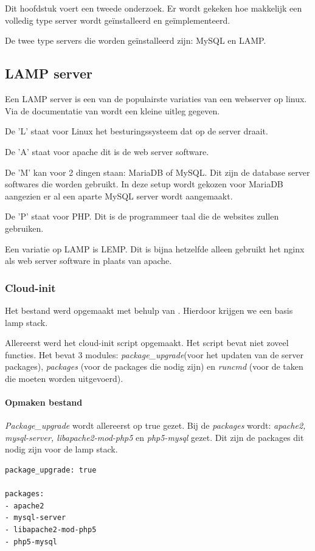 \chapter{}
\label{ch:serverconf}
Dit hoofdstuk voert een tweede onderzoek. Er wordt gekeken hoe makkelijk een volledig type server wordt geïnstalleerd en geïmplementeerd. 

De twee type servers die worden geïnstalleerd zijn: MySQL en LAMP.

\section{LAMP server}
Een LAMP server is een van de populairste variaties van een webserver op linux. Via de documentatie van \autocite{lamp} wordt een kleine uitleg gegeven.

De 'L' staat voor Linux het besturingssysteem dat op de server draait. 

De 'A' staat voor apache dit is de web server software. 

De 'M' kan voor 2 dingen staan: MariaDB of MySQL. Dit zijn de database server softwares die worden gebruikt. In deze setup wordt gekozen voor MariaDB aangezien er al een aparte MySQL server wordt aangemaakt.

De 'P' staat voor PHP. Dit is de programmeer taal die de websites zullen gebruiken.

Een variatie op LAMP is LEMP. Dit is bijna hetzelfde alleen gebruikt het nginx als web server software in plaats van apache.


\subsection{Cloud-init}
Het bestand werd opgemaakt met behulp van \autocite{butcher}. Hierdoor krijgen we een basis lamp stack.

Allereerst werd het cloud-init script opgemaakt. Het script bevat niet zoveel functies. Het bevat 3 modules: \textit{package\_upgrade}(voor het updaten van de server packages), \textit{packages} (voor de packages die nodig zijn) en \textit{runcmd} (voor de taken die moeten worden uitgevoerd).

\subsubsection{Opmaken bestand}
\textit{Package\_upgrade} wordt allereerst op true gezet. Bij de \textit{packages} wordt: \textit{apache2, mysql-server, libapache2-mod-php5} en \textit{php5-mysql} gezet. Dit zijn de packages dit nodig zijn voor de lamp stack.
\begin{lstlisting}[basicstyle=\small]
package_upgrade: true

packages:
- apache2
- mysql-server
- libapache2-mod-php5
- php5-mysql
\end{lstlisting}


